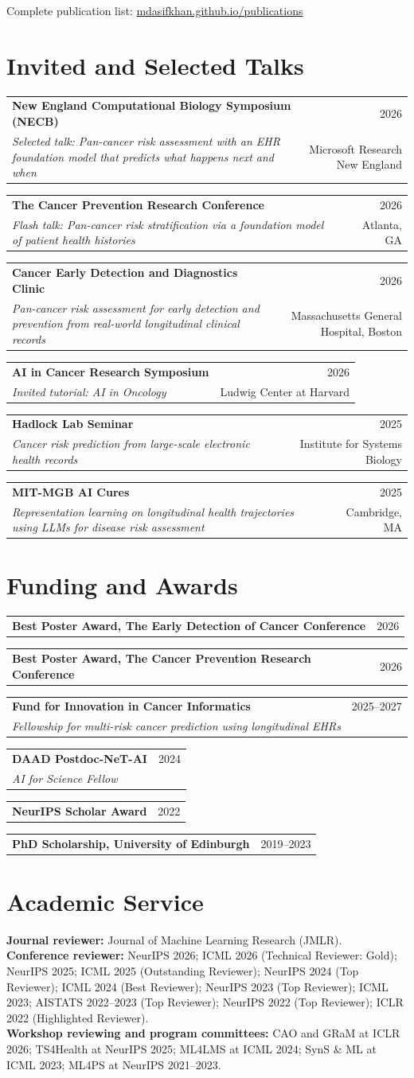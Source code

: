 \documentclass[10pt,a4paper]{article}
\makeatletter
\newcommand{\entry}[4]{%
  \par\noindent\begin{tabularx}{\textwidth}{@{}Xr@{}}
    \textbf{#1} & \color{muted}#2 \\
    \textit{#3} & \color{muted}#4
  \end{tabularx}\par\vspace{3pt}
}
\newcommand{\award}[2]{%
  \par\noindent\begin{tabularx}{\textwidth}{@{}Xr@{}}
    \textbf{#1} & \color{muted}#2
  \end{tabularx}\par\vspace{3pt}
}
\makeatother
\begin{document}
\small Complete publication list: \href{https://mdasifkhan.github.io/publications/}{mdasifkhan.github.io/publications}

\section{Invited and Selected Talks}
\entry{New England Computational Biology Symposium (NECB)}{2026}{Selected talk: Pan-cancer risk assessment with an EHR foundation model that predicts what happens next and when}{Microsoft Research New England}
\entry{The Cancer Prevention Research Conference}{2026}{Flash talk: Pan-cancer risk stratification via a foundation model of patient health histories}{Atlanta, GA}
\entry{Cancer Early Detection and Diagnostics Clinic}{2026}{Pan-cancer risk assessment for early detection and prevention from real-world longitudinal clinical records}{Massachusetts General Hospital, Boston}
\entry{AI in Cancer Research Symposium}{2026}{Invited tutorial: AI in Oncology}{Ludwig Center at Harvard}
\entry{Hadlock Lab Seminar}{2025}{Cancer risk prediction from large-scale electronic health records}{Institute for Systems Biology}
\entry{MIT-MGB AI Cures}{2025}{Representation learning on longitudinal health trajectories using LLMs for disease risk assessment}{Cambridge, MA}

\section{Funding and Awards}
\award{Best Poster Award, The Early Detection of Cancer Conference}{2026}
\award{Best Poster Award, The Cancer Prevention Research Conference}{2026}
\entry{Fund for Innovation in Cancer Informatics}{2025--2027}{Fellowship for multi-risk cancer prediction using longitudinal EHRs}{}
\entry{DAAD Postdoc-NeT-AI}{2024}{AI for Science Fellow}{}
\award{NeurIPS Scholar Award}{2022}
\award{PhD Scholarship, University of Edinburgh}{2019--2023}

\section{Academic Service}
\textbf{Journal reviewer:} Journal of Machine Learning Research (JMLR).\\
\textbf{Conference reviewer:} NeurIPS 2026; ICML 2026 (Technical Reviewer: Gold); NeurIPS 2025; ICML 2025 (Outstanding Reviewer); NeurIPS 2024 (Top Reviewer); ICML 2024 (Best Reviewer); NeurIPS 2023 (Top Reviewer); ICML 2023; AISTATS 2022--2023 (Top Reviewer); NeurIPS 2022 (Top Reviewer); ICLR 2022 (Highlighted Reviewer).\\
\textbf{Workshop reviewing and program committees:} CAO and GRaM at ICLR 2026; TS4Health at NeurIPS 2025; ML4LMS at ICML 2024; SynS \& ML at ICML 2023; ML4PS at NeurIPS 2021--2023.
\end{document}
